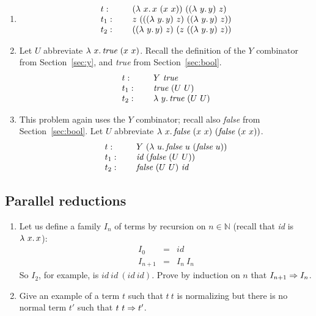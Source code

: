 \begin{enumerate}
\item
\[
  \begin{array}{lll}
    t: & \ & (\lambda\ x.\, x\ (x\ x))\ ((\lambda\ y.\, y)\ z) \\
    t_1: & \ & z\ (((\lambda\ y.\, y)\ z)\ ((\lambda\ y.\, y)\ z))\\
    t_2: & \ & ((\lambda\ y.\, y)\ z)\ (z\ ((\lambda\ y.\, y)\ z))
  \end{array}
  \]

\item Let $U$ abbreviate $\lam{x}{\textit{true}\ (x\ x)}$.  Recall the definition of the $Y$ combinator from Section~\ref{sec:y}, and \textit{true} from Section~\ref{sec:bool}.
  \[
  \begin{array}{lll}
    t: & \ & Y\ \textit{true} \\
    t_1: & \ & \textit{true}\ (U\ U) \\
    t_2: & \ & \lambda\ y.\, \textit{true}\ (U\ U)
  \end{array}
  \]
  
\item This problem again uses the $Y$ combinator; recall also \textit{false} from Section~\ref{sec:bool}.  Let
  $U$ abbreviate $\lam{x}{\textit{false}\ (x\ x)\ (\textit{false}\ (x\ x))}$. 
\[
  \begin{array}{lll}
    t: & \ & Y\ (\lam{u}{\textit{false}\ u\ (\textit{false}\ u)}) \\
    t_1: & \ & \textit{id}\ (\textit{false}\ (U\ U)) \\
    t_2: & \ & \textit{false}\ (U\ U)\ \textit{id}
  \end{array}
  \]

\end{enumerate}

\subsection{Parallel reductions}

\begin{enumerate}
\item Let us define a family $I_n$ of terms by recursion on $n\in\mathbb{N}$ (recall that \textit{id} is $\lambda\ x.\, x$):
  \[
  \begin{array}{lll}
    I_0 & = & \textit{id} \\
    I_{n+1} & = & I_n\ I_n
  \end{array}
  \]
  \noindent So $I_2$, for example, is
  $\textit{id}\ \textit{id}\ (\textit{id}\ \textit{id})$.  Prove by
  induction on $n$ that $I_{n+1} \Rightarrow I_n$.

  \item Give an example of a term $t$ such that $t\ t$ is normalizing but there is no normal term $t'$ such that $t\ t\Rightarrow t'$.

\end{enumerate}

